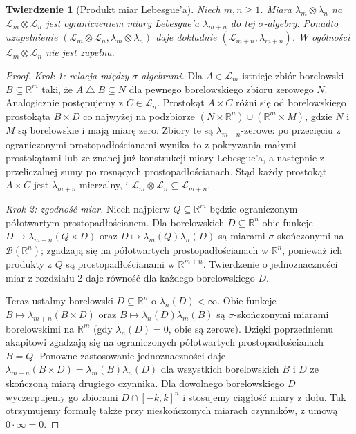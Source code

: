 \documentclass[11pt,a4paper,oneside]{book}
\numberwithin{equation}{chapter}
\theoremstyle{plain}
\newtheorem{twierdzenie}{Twierdzenie}[chapter]
\theoremstyle{definition}
\theoremstyle{remark}
\begin{document}
\begin{twierdzenie}[Produkt miar Lebesgue'a]
\label{thm:lebesgue-products-12}
Niech $m,n\ge1$. Miara $\lambda_m\otimes\lambda_n$
na $\mathcal L_m\otimes\mathcal L_n$ jest ograniczeniem
miary Lebesgue'a $\lambda_{m+n}$ do tej
$\sigma$-algebry. Ponadto uzupełnienie
$(\mathcal L_m\otimes\mathcal L_n,
\lambda_m\otimes\lambda_n)$ daje dokładnie
$(\mathcal L_{m+n},\lambda_{m+n})$.
W ogólności $\mathcal L_m\otimes\mathcal L_n$
nie jest zupełna.
\end{twierdzenie}
\begin{proof}
\emph{Krok 1: relacja między $\sigma$-algebrami.}
Dla $A\in\mathcal L_m$ istnieje zbiór borelowski
$B\subseteq\mathbb R^m$ taki, że
$A\mathbin\triangle B\subseteq N$ dla pewnego
borelowskiego zbioru zerowego $N$.
Analogicznie postępujemy z $C\in\mathcal L_n$.
Prostokąt $A\times C$ różni się od
borelowskiego prostokąta $B\times D$ co najwyżej
na podzbiorze
$(N\times\mathbb R^n)\cup(\mathbb R^m\times M)$,
gdzie $N$ i $M$ są borelowskie i mają miarę zero.
Zbiory te są $\lambda_{m+n}$-zerowe:
po przecięciu z ograniczonymi prostopadłościanami
wynika to z pokrywania małymi prostokątami
lub ze znanej już konstrukcji miary Lebesgue'a,
a następnie z przeliczalnej sumy po rosnących
prostopadłościanach. Stąd każdy prostokąt
$A\times C$ jest $\lambda_{m+n}$-mierzalny,
i $\mathcal L_m\otimes\mathcal L_n\subseteq\mathcal L_{m+n}$.

\emph{Krok 2: zgodność miar.}
Niech najpierw $Q\subseteq\mathbb R^m$ będzie ograniczonym
półotwartym prostopadłościanem. Dla borelowskich
$D\subseteq\mathbb R^n$ obie funkcje
$D\mapsto\lambda_{m+n}(Q\times D)$ oraz
$D\mapsto\lambda_m(Q)\lambda_n(D)$ są miarami
$\sigma$-skończonymi na $\mathcal B(\mathbb R^n)$;
zgadzają się na półotwartych prostopadłościanach
w $\mathbb R^n$, ponieważ ich produkty z $Q$ są
prostopadłościanami w $\mathbb R^{m+n}$.
Twierdzenie o jednoznaczności miar z rozdziału 2
daje równość dla każdego borelowskiego $D$.

Teraz ustalmy borelowski $D\subseteq\mathbb R^n$
o $\lambda_n(D)<\infty$. Obie funkcje
$B\mapsto\lambda_{m+n}(B\times D)$ oraz
$B\mapsto\lambda_n(D)\lambda_m(B)$ są
$\sigma$-skończonymi miarami borelowskimi na
$\mathbb R^m$ (gdy $\lambda_n(D)=0$, obie są
zerowe). Dzięki poprzedniemu akapitowi zgadzają
się na ograniczonych półotwartych prostopadłościanach
$B=Q$. Ponowne zastosowanie jednoznaczności
daje $\lambda_{m+n}(B\times D)=\lambda_m(B)\lambda_n(D)$
dla wszystkich borelowskich $B$ i $D$ ze
skończoną miarą drugiego czynnika. Dla dowolnego
borelowskiego $D$ wyczerpujemy go zbiorami
$D\cap[-k,k]^n$ i stosujemy ciągłość miary z dołu.
Tak otrzymujemy formułę także przy nieskończonych
miarach czynników, z umową $0\cdot\infty=0$.


\end{proof}
\end{document}
